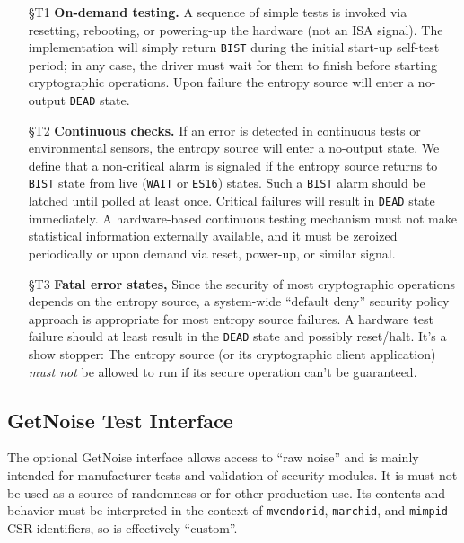     \begin{itemize}

    \item[\S T1]    {\bf On-demand testing.}
    A sequence of simple tests is invoked via resetting, rebooting, or
    powering-up the hardware (not an ISA signal). The implementation will
    simply return  \verb|BIST| during the initial start-up self-test period;
    in any case, the driver must wait for them to finish before starting
    cryptographic operations. Upon failure the entropy source will enter a
    no-output \verb|DEAD| state.

    \item[\S T2]    {\bf Continuous checks.}
    If an error is detected in continuous tests or environmental sensors,
    the entropy source will enter a no-output state.  We define that a
    non-critical alarm is signaled if the entropy source returns
    to \verb|BIST| state from live (\verb|WAIT| or \verb|ES16|) states.
    Such a \verb|BIST| alarm should be latched until polled at least once.
    Critical failures will result in \verb|DEAD| state immediately.
    A hardware-based continuous testing mechanism must not make statistical
    information externally available, and it must be zeroized periodically or
    upon demand via reset, power-up, or similar signal.

    \item[\S T3]{\bf Fatal error states,}
    Since the security of most cryptographic operations depends on the
    entropy source, a system-wide ``default deny'' security policy approach
    is appropriate for most entropy source failures.
    A hardware test failure should at least result in the \verb|DEAD|
    state and possibly reset/halt. It's a show stopper: The entropy
    source (or its cryptographic client application) \emph{must not} be
    allowed to run if its secure operation can't be guaranteed.

    \end{itemize}

\subsection{GetNoise Test Interface}
\label{sec:getnoise}

    The optional GetNoise interface allows access to ``raw noise'' and
    is mainly intended for manufacturer tests and validation of security
    modules. It is must not be used as a source of randomness or for
    other production use. Its contents and behavior must be interpreted
    in the context of {\tt mvendorid}, {\tt marchid}, and {\tt mimpid}
    CSR identifiers, so  is effectively ``custom''.

